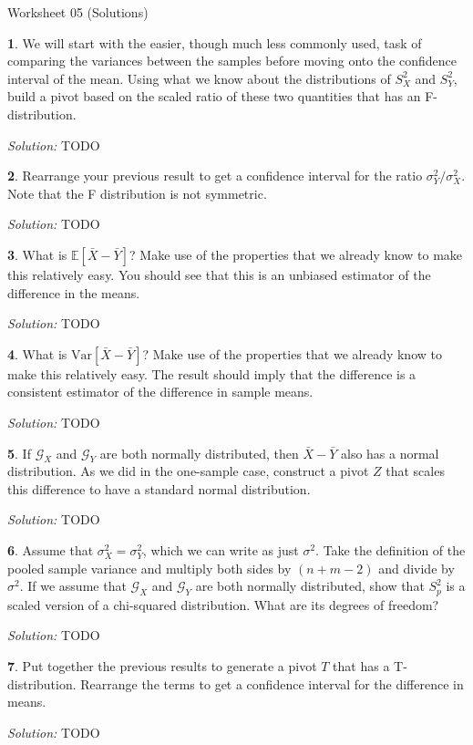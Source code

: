 \documentclass{tufte-handout}
\begin{document}
\justify

{\LARGE Worksheet 05 (Solutions)}

\vspace*{18pt}


\textbf{1}. We will start with the easier, though much less commonly used, task of
comparing the variances between the samples before moving onto the confidence
interval of the mean. Using what we know about the distributions of $S_X^2$ and
$S_Y^2$, build a pivot based on the scaled ratio of these two quantities that
has an F-distribution.

\textit{Solution:} TODO

\textbf{2}. Rearrange your previous result to get a confidence interval for the ratio
$\sigma_Y^2 / \sigma_X^2$. Note that the F distribution is not symmetric.

\textit{Solution:} TODO

\textbf{3}. What is $\mathbb{E}[\bar{X} - \bar{Y}]$? Make use of the properties that we
already know to make this relatively easy. You should see that this is an
unbiased estimator of the difference in the means.

\textit{Solution:} TODO

\textbf{4}. What is $\text{Var}[\bar{X} - \bar{Y}]$? Make use of the properties that we
already know to make this relatively easy. The result should imply that the
difference is a consistent estimator of the difference in sample means.

\textit{Solution:} TODO

\textbf{5}. If $\mathcal{G}_X$ and $\mathcal{G}_Y$ are both normally distributed, then
$\bar{X} - \bar{Y}$ also has a normal distribution. As we did in the one-sample
case, construct a pivot $Z$ that scales this difference to have a standard 
normal distribution.

\textit{Solution:} TODO

\textbf{6}. Assume that $\sigma_X^2 = \sigma_Y^2$, which we can write as just $\sigma^2$.
Take the definition of the pooled sample variance and multiply both sides by
$(n + m - 2)$ and divide by $\sigma^2$. If we assume that $\mathcal{G}_X$ and
$\mathcal{G}_Y$ are both normally distributed, show that $S_p^2$ is a scaled
version of a chi-squared distribution. What are its degrees of freedom?

\textit{Solution:} TODO

\textbf{7}. Put together the previous results to generate a pivot $T$ that has a T-distribution.
Rearrange the terms to get a confidence interval for the difference in means.

\textit{Solution:} TODO
\end{document}
